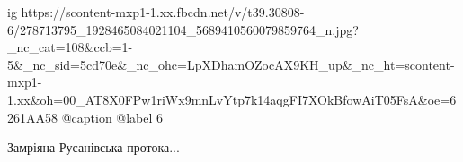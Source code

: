  
 
 
 
 

\ifcmt
  ig https://scontent-mxp1-1.xx.fbcdn.net/v/t39.30808-6/278713795_1928465084021104_5689410560079859764_n.jpg?_nc_cat=108&ccb=1-5&_nc_sid=5cd70e&_nc_ohc=LpXDhamOZocAX9KH_up&_nc_ht=scontent-mxp1-1.xx&oh=00_AT8X0FPw1riWx9mnLvYtp7k14aqgFI7XOkBfowAiT05FsA&oe=6261AA58
  @caption @label 6
\fi

Замріяна Русанівська протока...
